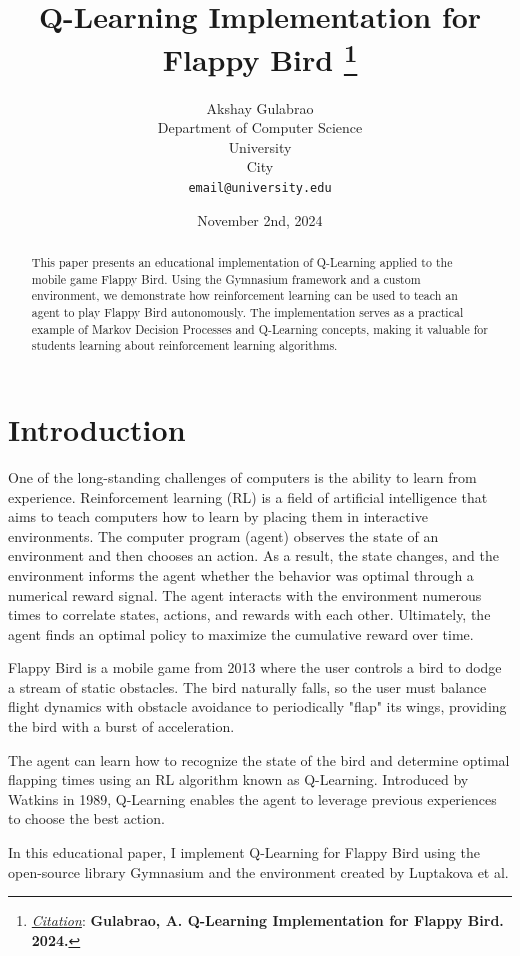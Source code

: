 \documentclass{article}
\title{Q-Learning Implementation for Flappy Bird
\thanks{\textit{\underline{Citation}}: 
\textbf{Gulabrao, A. Q-Learning Implementation for Flappy Bird. 2024.}} 
}
\author{
  Akshay Gulabrao \\
  Department of Computer Science \\
  University \\
  City \\
  \texttt{email@university.edu}
}
\date{November 2nd, 2024}
\begin{document}
\maketitle

\begin{abstract}
This paper presents an educational implementation of Q-Learning applied to the mobile game Flappy Bird. Using the Gymnasium framework and a custom environment, we demonstrate how reinforcement learning can be used to teach an agent to play Flappy Bird autonomously. The implementation serves as a practical example of Markov Decision Processes and Q-Learning concepts, making it valuable for students learning about reinforcement learning algorithms.
\end{abstract}


\section{Introduction}
One of the long-standing challenges of computers is the ability to learn from experience. Reinforcement learning (RL) is a field of artificial intelligence that aims to teach computers how to learn by placing them in interactive environments. The computer program (agent) observes the state of an environment and then chooses an action. As a result, the state changes, and the environment informs the agent whether the behavior was optimal through a numerical reward signal. The agent interacts with the environment numerous times to correlate states, actions, and rewards with each other. Ultimately, the agent finds an optimal policy to maximize the cumulative reward over time.

Flappy Bird is a mobile game from 2013 where the user controls a bird to dodge a stream of static obstacles. The bird naturally falls, so the user must balance flight dynamics with obstacle avoidance to periodically "flap" its wings, providing the bird with a burst of acceleration.

The agent can learn how to recognize the state of the bird and determine optimal flapping times using an RL algorithm known as Q-Learning.\cite{Q-Learning} Introduced by Watkins in 1989, Q-Learning enables the agent to leverage previous experiences to choose the best action.

In this educational paper, I implement Q-Learning for Flappy Bird using the open-source library Gymnasium and the environment created by Luptakova et al.\cite{Luptakova}
\end{document}
